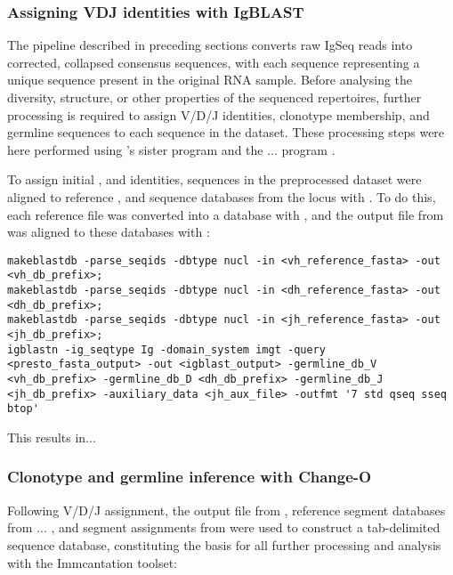 \subsubsection{Assigning VDJ identities with IgBLAST}

The  pipeline described in preceding sections converts raw IgSeq reads into corrected, collapsed consensus sequences, with each sequence representing a unique sequence present in the original RNA sample. Before analysing the diversity, structure, or other properties of the sequenced repertoires, further processing is required to assign V/D/J identities, clonotype membership, and germline sequences to each sequence in the dataset. These processing steps were here performed using 's sister program  and the ... program . %

To assign initial \vh, \dh and \jh identities, sequences in the preprocessed dataset were aligned to reference \vh, \dh and \jh sequence databases from the \nfu \igh{} locus with . To do this, each reference file was converted into a  database with , and the output  file from  was aligned to these databases with :

\begin{lstlisting}
makeblastdb -parse_seqids -dbtype nucl -in <vh_reference_fasta> -out <vh_db_prefix>;
makeblastdb -parse_seqids -dbtype nucl -in <dh_reference_fasta> -out <dh_db_prefix>;
makeblastdb -parse_seqids -dbtype nucl -in <jh_reference_fasta> -out <jh_db_prefix>;
igblastn -ig_seqtype Ig -domain_system imgt -query <presto_fasta_output> -out <igblast_output> -germline_db_V <vh_db_prefix> -germline_db_D <dh_db_prefix> -germline_db_J <jh_db_prefix> -auxiliary_data <jh_aux_file> -outfmt '7 std qseq sseq btop'
\end{lstlisting}

This results in... %

\subsubsection{Clonotype and germline inference with Change-O}

Following V/D/J assignment, the output  file from , reference segment databases from ... %
, and segment assignments from  were used to construct a tab-delimited  sequence database, constituting the basis for all further processing and analysis with the Immcantation toolset: %

